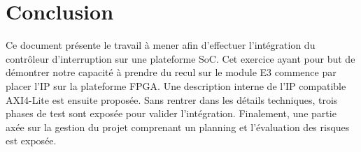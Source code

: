 \section{Conclusion}
Ce document présente le travail à mener afin d’effectuer l’intégration du contrôleur d'interruption sur une plateforme SoC.
Cet exercice ayant pour but de démontrer notre capacité à prendre du recul sur le module E3 commence par placer l'IP sur la plateforme FPGA.
Une description interne de l'IP compatible AXI4-Lite est ensuite proposée.
Sans rentrer dans les détails techniques, trois phases de test sont exposée pour valider l'intégration.
Finalement, une partie axée sur la gestion du projet comprenant un planning et l'évaluation des risques est exposée.

